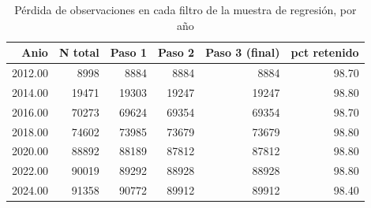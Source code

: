 \begin{table}[ht]
\centering
\caption{P\'erdida de observaciones en cada filtro de la muestra de regresi\'on, por a\~{n}o} 
\label{tab:12b_flowchart_perdidas_anio}
\begin{tabular}{rrrrrr}
  \toprule
Anio & N total & Paso 1 & Paso 2 & Paso 3 (final) & pct retenido \\ 
  \midrule
2012.00 & 8998 & 8884 & 8884 & 8884 & 98.70 \\ 
  2014.00 & 19471 & 19303 & 19247 & 19247 & 98.80 \\ 
  2016.00 & 70273 & 69624 & 69354 & 69354 & 98.70 \\ 
  2018.00 & 74602 & 73985 & 73679 & 73679 & 98.80 \\ 
  2020.00 & 88892 & 88189 & 87812 & 87812 & 98.80 \\ 
  2022.00 & 90019 & 89292 & 88928 & 88928 & 98.80 \\ 
  2024.00 & 91358 & 90772 & 89912 & 89912 & 98.40 \\ 
   \bottomrule
\end{tabular}
\end{table}

